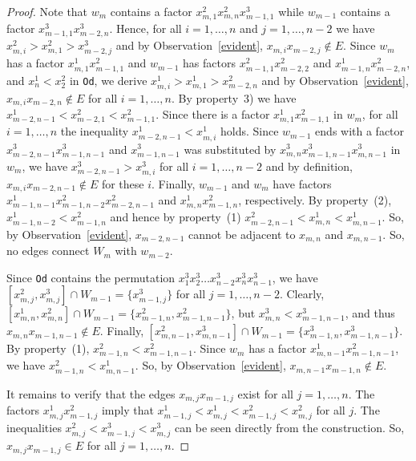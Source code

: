 \documentclass[11pt]{article}
\begin{document}
\begin{proof}
Note that $w_m$ contains a factor  $x_{m,1}^2x_{m,n}^2x_{m-1,1}^3$ while $w_{m-1}$ contains a factor $x_{m-1,1}^3x_{m-2,n}^3$. Hence,
 for all $i=1,\ldots,n$ and $j=1,\ldots,n-2$ we have $x_{m,i}^2>x_{m,1}^2>x_{m-2,j}^3$ and by Observation~\ref{evident}, $x_{m,i}x_{m-2,j}\not\in E$. 
Since $w_m$ has a factor $x_{m,1}^1x_{m-1,1}^2$ and $w_{m-1}$ has factors  $x_{m-1,1}^2x_{m-2,2}^2$ and $x_{m-1,n}^1x_{m-2,n}^2$, and $x_n^1<x_2^2$ in \texttt{Od}, we derive
$x_{m,i}^1>x_{m,1}^1>x_{m-2,n}^2$ and  by Observation~\ref{evident}, $x_{m,i}x_{m-2,n}\not\in E$ for all $i=1,\ldots,n$. By property~3) we have
$x_{m-2,n-1}^1<x_{m-2,1}^2<x_{m-1,1}^2$. Since there is a factor $x_{m,1}^1x_{m-1,1}^2$ in $w_m$, for all $i=1,\ldots,n$ the inequality $x_{m-2,n-1}^1<x_{m,i}^1$ holds.
Since $w_{m-1}$ ends with a factor $x_{m-2,n-1}^3x_{m-1,n-1}^3$ and $x_{m-1,n-1}^3$ was substituted by $ x_{m,n}^3x_{m-1,n-1}^3x_{m,n-1}^3$ in $w_m$, we have $x_{m-2,n-1}^3>x_{m,i}^3$ for all $i=1,\ldots, n-2$ and  by definition, $x_{m,i}x_{m-2,n-1}\not\in E$ for these $i$. Finally, $w_{m-1}$ and $w_m$ have factors 
$ x_{m-1,n-1}^1x_{m-1,n-2}^2x_{m-2,n-1}^2$ and $x_{m,n}^1x_{m-1,n}^2$, respectively. By property~(2), $x_{m-1,n-2}^1<x_{m-1,n}^2$ and hence by property~(1)
$x_{m-2,n-1}^2<x_{m,n}^1<x_{m,n-1}^1$. So, by Observation~\ref{evident}, $x_{m-2,n-1}$ cannot be adjacent to $x_{m,n}$ and $x_{m,n-1}$. So, no edges connect $W_m$ with $w_{m-2}$.

Since \texttt{Od} contains the permutation $x_1^3x_2^3\ldots x_{n-2}^3x_n^3x_{n-1}^3$, we have $[x_{m,j}^2,x_{m,j}^3]\cap W_{m-1}=\{x_{m-1,j}^3\}$ for all $j=1,\ldots,n-2$. 
Clearly,  $[x_{m,n}^1,x_{m,n}^2]\cap W_{m-1}=\{x_{m-1,n}^2,x_{m-1,n-1}^2\}$, but $x_{m,n}^3<x_{m-1,n-1}^3$, and thus $x_{m,n}x_{m-1,n-1}\not\in E$.
Finally,  $[x_{m,n-1}^2,x_{m,n-1}^3]\cap W_{m-1}=\{x_{m-1,n}^3,x_{m-1,n-1}^3\}$. By property~(1), $x_{m-1,n}^2<x_{m-1,n-1}^2$. Since $w_m$ has a factor
$x_{m,n-1}^1x_{m-1,n-1}^2$, we have $x_{m-1,n}^2<x_{m,n-1}^1$. So,  by Observation~\ref{evident}, $x_{m,n-1}x_{m-1,n}\not\in E$.

It remains to verify that the edges $x_{m,j}x_{m-1,j}$ exist for all $j=1,\ldots,n$. The factors $x_{m,j}^1x_{m-1,j}^2$ imply that 
$x_{m-1,j}^1<x_{m,j}^1<x_{m-1,j}^2<x_{m,j}^2$ for all $j$. The inequalities $x_{m,j}^2<x_{m-1,j}^3<x_{m,j}^3$ can be seen directly from the construction. So, 
 $x_{m,j}x_{m-1,j}\in E$ for all $j=1,\ldots, n$.
\end{proof}
\end{document}
